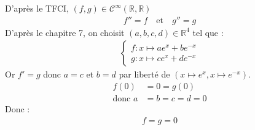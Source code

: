 \documentclass[../main.tex]{subfiles}
\begin{document}
\noindent D'après le TFCI, $(f, g)\in \mathcal{C}^{\infty}(\mathbb{R}, \mathbb{R})$
\begin{align*}
    f'' = f \quad \text{et} \quad g'' = g
\end{align*}
D'après le chapitre 7, on choisit $(a, b, c, d)\in \mathbb{R}^4$ tel que : 
\begin{align*}
    \begin{cases}
        f:x\mapsto a e^x + b e^{-x} \\
        g:x\mapsto c e^x + d e^{-x}
    \end{cases}
\end{align*}
Or $f' = g$ donc $a = c$ et $b = d$ par liberté de $(x\mapsto e^{x}, x\mapsto e^{-x})$. \\
\begin{align*}
    f(0) &= 0 = g(0) \\
    \text{donc } a &= b = c = d = 0
\end{align*}
Donc : 
\begin{align*}
    f = g = 0
\end{align*}
\end{document}
